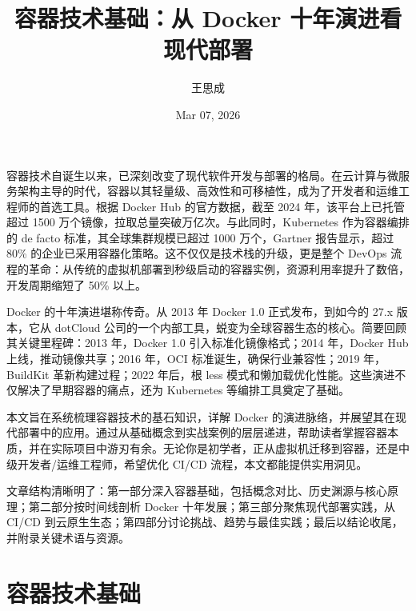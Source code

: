 \title{容器技术基础：从 Docker 十年演进看现代部署}
\author{王思成}
\date{Mar 07, 2026}
\maketitle
容器技术自诞生以来，已深刻改变了现代软件开发与部署的格局。在云计算与微服务架构主导的时代，容器以其轻量级、高效性和可移植性，成为了开发者和运维工程师的首选工具。根据 Docker Hub 的官方数据，截至 2024 年，该平台上已托管超过 1500 万个镜像，拉取总量突破万亿次。与此同时，Kubernetes 作为容器编排的 de facto 标准，其全球集群规模已超过 1000 万个，Gartner 报告显示，超过 80\%{} 的企业已采用容器化策略。这不仅仅是技术栈的升级，更是整个 DevOps 流程的革命：从传统的虚拟机部署到秒级启动的容器实例，资源利用率提升了数倍，开发周期缩短了 50\%{} 以上。\par
Docker 的十年演进堪称传奇。从 2013 年 Docker 1.0 正式发布，到如今的 27.x 版本，它从 dotCloud 公司的一个内部工具，蜕变为全球容器生态的核心。简要回顾其关键里程碑：2013 年，Docker 1.0 引入标准化镜像格式；2014 年，Docker Hub 上线，推动镜像共享；2016 年，OCI 标准诞生，确保行业兼容性；2019 年，BuildKit 革新构建过程；2022 年后，根 less 模式和懒加载优化性能。这些演进不仅解决了早期容器的痛点，还为 Kubernetes 等编排工具奠定了基础。\par
本文旨在系统梳理容器技术的基石知识，详解 Docker 的演进脉络，并展望其在现代部署中的应用。通过从基础概念到实战案例的层层递进，帮助读者掌握容器本质，并在实际项目中游刃有余。无论你是初学者，正从虚拟机迁移到容器，还是中级开发者/运维工程师，希望优化 CI/CD 流程，本文都能提供实用洞见。\par
文章结构清晰明了：第一部分深入容器基础，包括概念对比、历史渊源与核心原理；第二部分按时间线剖析 Docker 十年发展；第三部分聚焦现代部署实践，从 CI/CD 到云原生生态；第四部分讨论挑战、趋势与最佳实践；最后以结论收尾，并附录关键术语与资源。\par
\chapter{容器技术基础}
